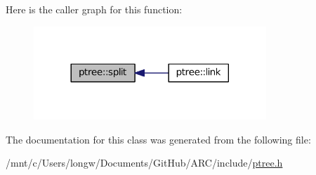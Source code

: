 Here is the caller graph for this function\+:\nopagebreak
\begin{figure}[H]
\begin{center}
\leavevmode
\includegraphics[width=248pt]{classptree_ae4c20eddf5cfcf45e5f809567c967bf9_icgraph}
\end{center}
\end{figure}




The documentation for this class was generated from the following file\+:\begin{DoxyCompactItemize}
\item 
/mnt/c/\+Users/longw/\+Documents/\+Git\+Hub/\+A\+R\+C/include/\hyperlink{ptree_8h}{ptree.\+h}\end{DoxyCompactItemize}
